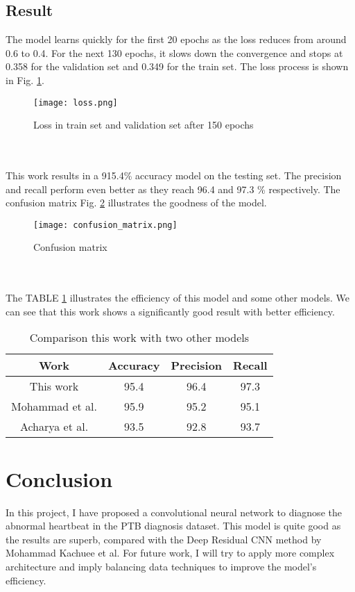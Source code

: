 \documentclass[conference]{IEEEtran}
\begin{document}
\subsection{Result}
The model learns quickly for the first 20 epochs as the loss reduces from around 0.6 to 0.4. For the next 130 epochs, it slows down the convergence and stops at 0.358 for the validation set and 0.349 for the train set. The loss process is shown in Fig. \ref{fig:Loss}.
\begin{figure}[hbt!]
    \centering
    \texttt{[image: loss.png]}
    \caption{Loss in train set and validation set after 150 epochs}
    \label{fig:Loss}
\end{figure}
\mbox{}\\\\
This work results in a 915.4\% accuracy model on the testing set. The precision and recall perform even better as they reach 96.4 and 97.3 \% respectively. The confusion matrix Fig. \ref{fig:cm} illustrates the goodness of the model.
\begin{figure}[hbt!]
    \centering
    \texttt{[image: confusion\_matrix.png]}
    \caption{Confusion matrix}
    \label{fig:cm}
\end{figure}
\mbox{}\\\\
The TABLE \ref{compare} illustrates the efficiency of this model and some other models. We can see that this work shows a significantly good result with better efficiency.
\begin{table}[h]
\begin{center}
\caption{Comparison this work with two other models}
\label{compare}
\begin{tabular}{||c c c c||} 

 \hline
 Work & Accuracy & Precision & Recall \\ [0.5ex] 
 \hline\hline
 This work & 95.4 & 96.4 & 97.3\\ 
 \hline
 Mohammad et al. & 95.9 & 95.2 & 95.1\\
 \hline
 Acharya et al. & 93.5 &92.8 & 93.7\\
 [1ex] 
 \hline
\end{tabular}
\end{center}
\end{table}

\section{Conclusion}
In this project, I have proposed a convolutional neural network to diagnose the abnormal heartbeat in the PTB diagnosis dataset. This model is quite good as the results are superb, compared with the Deep Residual CNN method by Mohammad Kachuee et al. For future work, I will try to apply more complex architecture and imply balancing data techniques to improve the model's efficiency.
\end{document}
